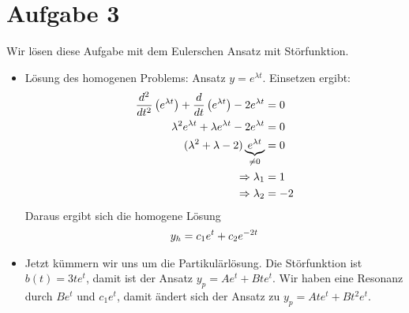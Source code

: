 \documentclass{article}
\begin{document}
	\section*{Aufgabe 3}
	Wir lösen diese Aufgabe mit dem Eulerschen Ansatz mit Störfunktion.
	\begin{itemize}
		\item Lösung des homogenen Problems: Ansatz $y = e^{\lambda t}$. Einsetzen ergibt:
		\begin{align}
			\frac{d^2}{dt^2} \left(e^{\lambda t}\right) + \frac{d}{dt} \left(e^{\lambda t}\right) - 2e^{\lambda t} &= 0 \notag \\
			\lambda^2 e^{\lambda t} + \lambda e^{\lambda t} - 2e^{\lambda t} &= 0 \notag \\
			(\lambda^2 + \lambda - 2)\underbrace{e^{\lambda t}}_{\neq 0} &= 0 \notag \\
			\Rightarrow \lambda_1 &= 1 \notag \\
			\Rightarrow \lambda_2 &= -2 \notag
		\end{align}
		Daraus ergibt sich die homogene Lösung
		\begin{align}
			y_h = c_1e^t + c_2e^{-2t} \notag
		\end{align}
		\item Jetzt kümmern wir uns um die Partikulärlösung. Die Störfunktion ist $b(t) = 3te^t$, damit ist der Ansatz $y_p = Ae^t + Bte^t$. Wir haben eine Resonanz durch $Be^t$ und $c_1e^t$, damit ändert sich der Ansatz zu $y_p = Ate^t + Bt^2e^t$.
		

\end{itemize}
\end{document}
